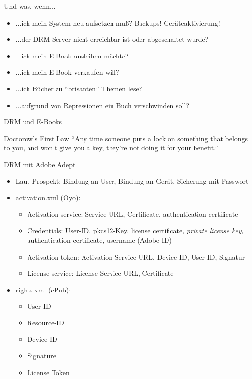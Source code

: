 \documentclass[hyperref={pdfpagelabels=false}]{beamer}
\begin{document}
\begin{frame}{Und was, wenn...}
	\begin{itemize}
		\item ...ich mein System neu aufsetzen muß? Backups! Geräteaktivierung!
		\item ...der DRM-Server nicht erreichbar ist oder abgeschaltet wurde?
		\item ...ich mein E-Book ausleihen möchte?
		\item ...ich mein E-Book verkaufen will?
		\item ...ich Bücher zu "`brisanten"' Themen lese?
		\item ...aufgrund von Repressionen ein Buch verschwinden soll?
	\end{itemize}
\end{frame}

\begin{frame}{DRM und E-Books}
	\begin{block}{Doctorow's First Law}
		"`Any time someone puts a lock on something that belongs to you, and won’t give you a key, they’re not doing it for your benefit."'
	\end{block}
\end{frame}

\begin{frame}{DRM mit Adobe Adept}
	\begin{itemize}
		\item Laut Prospekt: Bindung an User, Bindung an Gerät, Sicherung mit Passwort
		\item activation.xml (Oyo):
		\begin{itemize}
			\item Activation service: Service URL, Certificate, authentication certificate
			\item Credentials: User-ID, pkcs12-Key, license certificate, {\em private license key}, authentication certificate, username (Adobe ID)
			\item Activation token: Activation Service URL, Device-ID, User-ID, Signatur
			\item License service: License Service URL, Certificate
		\end{itemize}
		\item rights.xml (ePub):
		\begin{itemize}
			\item User-ID
			\item Resource-ID
			\item Device-ID
			\item Signature
			\item License Token
		\end{itemize}
	\end{itemize}
\end{frame}
\end{document}
